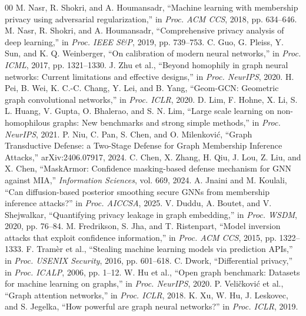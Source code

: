 \documentclass[conference]{IEEEtran}
\begin{document}
\begin{thebibliography}{00}
 M. Nasr, R. Shokri, and A. Houmansadr, ``Machine learning with membership privacy using adversarial regularization,'' in \emph{Proc. ACM CCS}, 2018, pp. 634--646.
 M. Nasr, R. Shokri, and A. Houmansadr, ``Comprehensive privacy analysis of deep learning,'' in \emph{Proc. IEEE S\&P}, 2019, pp. 739--753.
 C. Guo, G. Pleiss, Y. Sun, and K. Q. Weinberger, ``On calibration of modern neural networks,'' in \emph{Proc. ICML}, 2017, pp. 1321--1330.
 J. Zhu et al., ``Beyond homophily in graph neural networks: Current limitations and effective designs,'' in \emph{Proc. NeurIPS}, 2020.
 H. Pei, B. Wei, K. C.-C. Chang, Y. Lei, and B. Yang, ``Geom-GCN: Geometric graph convolutional networks,'' in \emph{Proc. ICLR}, 2020.
 D. Lim, F. Hohne, X. Li, S. L. Huang, V. Gupta, O. Bhalerao, and S. N. Lim, ``Large scale learning on non-homophilous graphs: New benchmarks and strong simple methods,'' in \emph{Proc. NeurIPS}, 2021.
 P. Niu, C. Pan, S. Chen, and O. Milenkovi\'c, ``Graph Transductive Defense: a Two-Stage Defense for Graph Membership Inference Attacks,'' arXiv:2406.07917, 2024.
 C. Chen, X. Zhang, H. Qiu, J. Lou, Z. Liu, and X. Chen, ``MaskArmor: Confidence masking-based defense mechanism for GNN against MIA,'' \emph{Information Sciences}, vol. 669, 2024.
 A. Jnaini and M. Koulali, ``Can diffusion-based posterior smoothing secure GNNs from membership inference attacks?'' in \emph{Proc. AICCSA}, 2025.
 V. Duddu, A. Boutet, and V. Shejwalkar, ``Quantifying privacy leakage in graph embedding,'' in \emph{Proc. WSDM}, 2020, pp. 76--84.
 M. Fredrikson, S. Jha, and T. Ristenpart, ``Model inversion attacks that exploit confidence information,'' in \emph{Proc. ACM CCS}, 2015, pp. 1322--1333.
 F. Tram\`er et al., ``Stealing machine learning models via prediction APIs,'' in \emph{Proc. USENIX Security}, 2016, pp. 601--618.
 C. Dwork, ``Differential privacy,'' in \emph{Proc. ICALP}, 2006, pp. 1--12.
 W. Hu et al., ``Open graph benchmark: Datasets for machine learning on graphs,'' in \emph{Proc. NeurIPS}, 2020.
 P. Veli\v{c}kovi\'c et al., ``Graph attention networks,'' in \emph{Proc. ICLR}, 2018.
 K. Xu, W. Hu, J. Leskovec, and S. Jegelka, ``How powerful are graph neural networks?'' in \emph{Proc. ICLR}, 2019.

\end{thebibliography}
\end{document}
